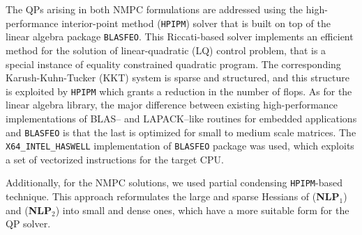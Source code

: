 The QPs arising in both NMPC formulations are addressed using the high-performance interior-point method (\texttt{HPIPM}) solver that is built on top of the linear algebra package \texttt{BLASFEO}. This Riccati-based solver implements an efficient method for the solution of linear-quadratic (LQ) control problem, that is a special instance of equality constrained quadratic program. The corresponding Karush-Kuhn-Tucker (KKT) system is sparse and structured, and this structure is exploited by \texttt{HPIPM} which grants a reduction in the number of flops. As for the linear algebra library, the major difference between existing high-performance implementations of BLAS-- and LAPACK--like routines for embedded applications and \texttt{BLASFEO} is that the last is optimized for small to medium scale matrices. The \texttt{X64\_INTEL\_HASWELL} implementation of \texttt{BLASFEO} package was used, which exploits a set of vectorized instructions for the target CPU. 

Additionally, for the NMPC solutions, we used partial condensing \texttt{HPIPM}-based technique. 
This approach reformulates the large and sparse Hessians of (\textbf{NLP$_1$}) and (\textbf{NLP$_2$}) into small and dense ones, which have a more suitable form for the QP solver. 